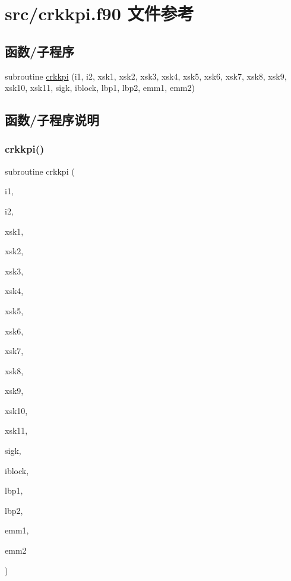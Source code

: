 \hypertarget{crkkpi_8f90}{}\section{src/crkkpi.f90 文件参考}
\label{crkkpi_8f90}
\subsection*{函数/子程序}
\begin{DoxyCompactItemize}
\item 
subroutine \mbox{\hyperlink{crkkpi_8f90_aafa15990bea1d1763e61f0a791e78b6b}{crkkpi}} (i1, i2, xsk1, xsk2, xsk3, xsk4, xsk5, xsk6, xsk7, xsk8, xsk9, xsk10, xsk11, sigk, iblock, lbp1, lbp2, emm1, emm2)
\end{DoxyCompactItemize}


\subsection{函数/子程序说明}
\mbox{\label{crkkpi_8f90_aafa15990bea1d1763e61f0a791e78b6b}} 
\subsubsection{\texorpdfstring{crkkpi()}{crkkpi()}}
{\footnotesize\ttfamily subroutine crkkpi (\begin{DoxyParamCaption}\item[{}]{i1,  }\item[{}]{i2,  }\item[{}]{xsk1,  }\item[{}]{xsk2,  }\item[{}]{xsk3,  }\item[{}]{xsk4,  }\item[{}]{xsk5,  }\item[{}]{xsk6,  }\item[{}]{xsk7,  }\item[{}]{xsk8,  }\item[{}]{xsk9,  }\item[{}]{xsk10,  }\item[{}]{xsk11,  }\item[{}]{sigk,  }\item[{}]{iblock,  }\item[{}]{lbp1,  }\item[{}]{lbp2,  }\item[{}]{emm1,  }\item[{}]{emm2 }\end{DoxyParamCaption})}



